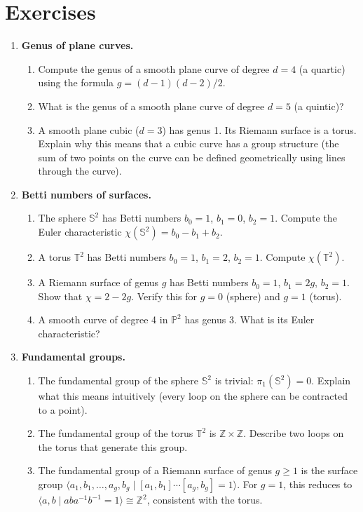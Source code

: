 \section*{Exercises}

\begin{enumerate}

    \item \textbf{Genus of plane curves.}
    \begin{enumerate}
        \item Compute the genus of a smooth plane curve of degree $d = 4$ (a quartic) using the formula $g = (d-1)(d-2)/2$.
        \item What is the genus of a smooth plane curve of degree $d = 5$ (a quintic)?
        \item A smooth plane cubic ($d = 3$) has genus 1. Its Riemann surface is a torus. Explain why this means that a cubic curve has a group structure (the sum of two points on the curve can be defined geometrically using lines through the curve).
    \end{enumerate}

    \item \textbf{Betti numbers of surfaces.}
    \begin{enumerate}
        \item The sphere $\mathbb{S}^2$ has Betti numbers $b_0 = 1$, $b_1 = 0$, $b_2 = 1$. Compute the Euler characteristic $\chi(\mathbb{S}^2) = b_0 - b_1 + b_2$.
        \item A torus $\mathbb{T}^2$ has Betti numbers $b_0 = 1$, $b_1 = 2$, $b_2 = 1$. Compute $\chi(\mathbb{T}^2)$.
        \item A Riemann surface of genus $g$ has Betti numbers $b_0 = 1$, $b_1 = 2g$, $b_2 = 1$. Show that $\chi = 2 - 2g$. Verify this for $g = 0$ (sphere) and $g = 1$ (torus).
        \item A smooth curve of degree 4 in $\mathbb{P}^2$ has genus 3. What is its Euler characteristic?
    \end{enumerate}

    \item \textbf{Fundamental groups.}
    \begin{enumerate}
        \item The fundamental group of the sphere $\mathbb{S}^2$ is trivial: $\pi_1(\mathbb{S}^2) = 0$. Explain what this means intuitively (every loop on the sphere can be contracted to a point).
        \item The fundamental group of the torus $\mathbb{T}^2$ is $\mathbb{Z} \times \mathbb{Z}$. Describe two loops on the torus that generate this group.
        \item The fundamental group of a Riemann surface of genus $g \geq 1$ is the surface group $\langle a_1, b_1, \ldots, a_g, b_g \mid [a_1, b_1] \cdots [a_g, b_g] = 1 \rangle$. For $g = 1$, this reduces to $\langle a, b \mid aba^{-1}b^{-1} = 1 \rangle \cong \mathbb{Z}^2$, consistent with the torus.
    \end{enumerate}


\end{enumerate}

